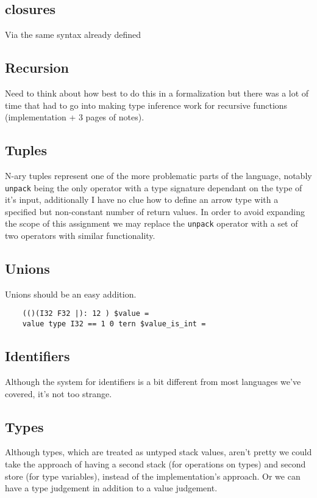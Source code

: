 \documentclass{article}
\begin{document}
\subsection{closures}
Via the same syntax already defined

\subsection{Recursion}
Need to think about how best to do this in a formalization but there was a lot of time that had to go into making type inference work for recursive functions (implementation + 3 pages of notes).

\subsection{Tuples}
N-ary tuples represent one of the more problematic parts of the language, notably \texttt{unpack} being the only operator with a type signature dependant on the type of it's input, additionally I have no clue how to define an arrow type with a specified but non-constant number of return values. In order to avoid expanding the scope of this assignment we may replace the \texttt{unpack} operator with a set of two operators with similar functionality.

\subsection{Unions}
Unions should be an easy addition.

\begin{verbatim}
    (()(I32 F32 |): 12 ) $value =
    value type I32 == 1 0 tern $value_is_int =
\end{verbatim}

\subsection{Identifiers}
Although the system for identifiers is a bit different from most languages we've covered, it's not too strange.

\subsection{Types}
Although types, which are treated as untyped stack values, aren't pretty we could take the approach of having a second stack (for operations on types) and second store (for type variables), instead of the implementation's approach. Or we can have a type judgement in addition to a value judgement. 
\end{document}
